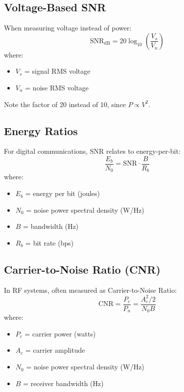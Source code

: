 \subsection{Voltage-Based SNR}

When measuring voltage instead of power:
\begin{equation}
\mathrm{SNR_{dB}} = 20\log_{10}\left(\frac{V_s}{V_n}\right)
\end{equation}
where:
\begin{itemize}
\item $V_s$ = signal RMS voltage
\item $V_n$ = noise RMS voltage
\end{itemize}

Note the factor of 20 instead of 10, since $P \propto V^2$.

\subsection{Energy Ratios}

For digital communications, SNR relates to energy-per-bit:
\begin{equation}
\frac{E_b}{N_0} = \mathrm{SNR} \cdot \frac{B}{R_b}
\end{equation}
where:
\begin{itemize}
\item $E_b$ = energy per bit (joules)
\item $N_0$ = noise power spectral density (W/Hz)
\item $B$ = bandwidth (Hz)
\item $R_b$ = bit rate (bps)
\end{itemize}

\subsection{Carrier-to-Noise Ratio (CNR)}

In RF systems, often measured as Carrier-to-Noise Ratio:
\begin{equation}
\mathrm{CNR} = \frac{P_c}{P_n} = \frac{A_c^2 / 2}{N_0 B}
\end{equation}
where:
\begin{itemize}
\item $P_c$ = carrier power (watts)
\item $A_c$ = carrier amplitude
\item $N_0$ = noise power spectral density (W/Hz)
\item $B$ = receiver bandwidth (Hz)
\end{itemize}

